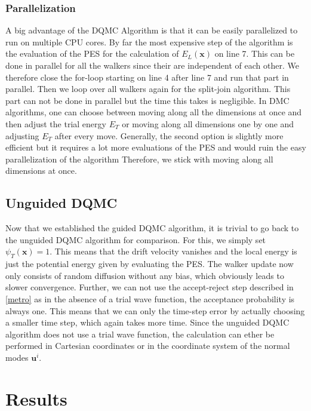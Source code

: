 \documentclass [12pt]{report}
\begin{document}
\subsection{Parallelization}
A big advantage of the DQMC Algorithm is that it can be easily parallelized to run on multiple CPU cores. By far the most expensive step of the algorithm is the evaluation of the PES for the calculation of $E_L(\bm{x})$ on line 7. This can be done in parallel for all the walkers since their are independent of each other. We therefore close the for-loop starting on line 4 after line 7 and run that part in parallel. Then we loop over all walkers again for the split-join algorithm. This part can not be done in parallel but the time this takes is negligible.
In DMC algorithms, one can choose between moving along all the dimensions at once and then adjust the trial energy $E_T$ or moving along all dimensions one by one and adjusting $E_T$ after every move. Generally, the second option is slightly more efficient but it requires a lot more evaluations of the PES and would ruin the easy parallelization of the algorithm Therefore, we stick with moving along all dimensions at once. 

\section{Unguided DQMC}
Now that we established the guided DQMC algorithm, it is trivial to go back to the unguided DQMC algorithm for comparison. For this, we simply set $\psi_T(\bm{x}) = 1$. This means that the drift velocity vanishes and the local energy is just the potential energy given by evaluating the PES. The walker update now only consists of random diffusion without any bias, which obviously leads to slower convergence. Further, we can not use the accept-reject step described in \ref{metro} as in the absence of a trial wave function, the acceptance probability is always one. This means that we can only the time-step error by actually choosing a smaller time step, which again takes more time. Since the unguided DQMC algorithm does not use a trial wave function, the calculation can ether be performed in Cartesian coordinates or in the coordinate system of the normal modes $\bm{u}^i$.

\chapter{Results}
\end{document}
